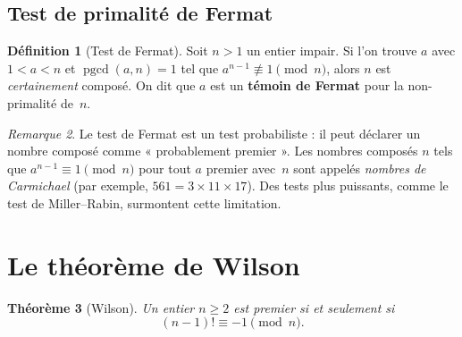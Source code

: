 \documentclass[12pt,a4paper,openany]{book}
\theoremstyle{definition}
\newtheorem{definition}{Définition}[chapter]
\theoremstyle{plain}
\newtheorem{theoreme}[definition]{Théorème}
\theoremstyle{remark}
\newtheorem{remarque}[definition]{Remarque}
\DeclareMathOperator{\pgcd}{pgcd}
\begin{document}
\subsection{Test de primalité de Fermat}
\label{subsec:test-fermat}

\begin{definition}[Test de Fermat]
\label{def:test-fermat}
Soit $n > 1$ un entier impair. Si l'on trouve $a$ avec $1 < a < n$ et
$\pgcd(a, n) = 1$ tel que $a^{n-1} \not\equiv 1 \pmod{n}$, alors $n$ est
\emph{certainement} composé. On dit que $a$ est un \textbf{témoin de Fermat}
 pour la non-primalité de~$n$.
\end{definition}

\begin{remarque}
Le test de Fermat est un test probabiliste : il peut déclarer un nombre composé
comme « probablement premier ». Les nombres composés $n$ tels que $a^{n-1} \equiv 1
\pmod{n}$ pour tout $a$ premier avec~$n$ sont appelés \emph{nombres de
Carmichael} (par exemple, $561 = 3 \times 11 \times 17$).
Des tests plus puissants, comme le test de Miller--Rabin,
surmontent cette limitation.
\end{remarque}

\section{Le théorème de Wilson}
\label{sec:wilson}

\begin{theoreme}[Wilson]
\label{thm:wilson}
Un entier $n \geqslant 2$ est premier si et seulement si
\[
  (n - 1)! \equiv -1 \pmod{n}.
\]
\end{theoreme}
\end{document}
